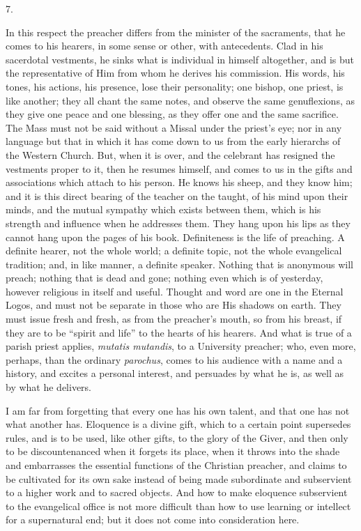 7.

In this respect the preacher differs from the minister of the
sacraments, that he comes to his hearers, in some sense or other, with
antecedents. Clad in his sacerdotal vestments, he sinks what is
individual in himself altogether, and is but the representative of Him
from whom he derives his commission. His words, his tones, his
actions, his presence, lose their personality; one bishop, one priest,
is like another; they all chant the same notes, and observe the
same genuflexions, as they give one peace and one blessing, as they
offer one and the same sacrifice. The Mass must not be said without a
Missal under the priest's eye; nor in any language but that in which
it has come down to us from the early hierarchs of the Western Church.
But, when it is over, and the celebrant has resigned the vestments
proper to it, then he resumes himself, and comes to us in the gifts
and associations which attach to his person. He knows his sheep, and
they know him; and it is this direct bearing of the teacher on the
taught, of his mind upon their minds, and the mutual sympathy which
exists between them, which is his strength and influence when he
addresses them. They hang upon his lips as they cannot hang upon the
pages of his book. Definiteness is the life of preaching. A definite
hearer, not the whole world; a definite topic, not the whole
evangelical tradition; and, in like manner, a definite speaker.
Nothing that is anonymous will preach; nothing that is dead and gone;
nothing even which is of yesterday, however religious in itself and
useful. Thought and word are one in the Eternal Logos, and must not be
separate in those who are His shadows on earth. They must issue fresh
and fresh, as from the preacher's mouth, so from his breast, if they
are to be ``spirit and life'' to the hearts of his hearers.
And what is true of a parish priest applies, \emph{mutatis mutandis},
to a University preacher; who, even more, perhaps, than the ordinary \emph{parochus},
comes to his audience with a name and a history, and excites a
personal interest, and persuades by what he is, as well as by what he
delivers.

I am far from forgetting that every one has his own talent, and
that one has not what another has. Eloquence is a divine gift, which
to a certain point supersedes rules, and is to be used, like
other gifts, to the glory of the Giver, and then only to be
discountenanced when it forgets its place, when it throws into the
shade and embarrasses the essential functions of the Christian
preacher, and claims to be cultivated for its own sake instead of
being made subordinate and subservient to a higher work and to sacred
objects. And how to make eloquence subservient to the evangelical
office is not more difficult than how to use learning or intellect for
a supernatural end; but it does not come into consideration here.

